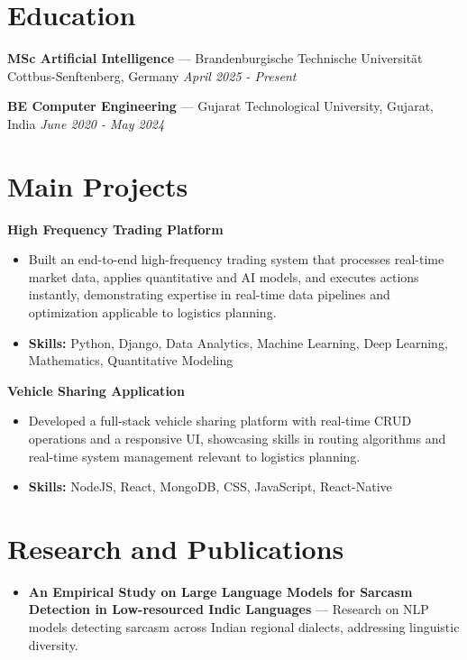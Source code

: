 \documentclass[a4paper,10pt]{article}
\begin{document}
\section*{Education}
\textbf{MSc Artificial Intelligence} — Brandenburgische Technische Universität Cottbus-Senftenberg, Germany \hfill \textit{April 2025 - Present}\par
\vspace{1.5pt}
\textbf{BE Computer Engineering} — Gujarat Technological University, Gujarat, India \hfill \textit{June 2020 - May 2024}\par

\section*{Main Projects}
\textbf{High Frequency Trading Platform}\par
\vspace{1pt}
\begin{itemize}
  \item Built an end-to-end high-frequency trading system that processes real-time market data, applies quantitative and AI models, and executes actions instantly, demonstrating expertise in real-time data pipelines and optimization applicable to logistics planning.
  \item \textbf{Skills:} Python, Django, Data Analytics, Machine Learning, Deep Learning, Mathematics, Quantitative Modeling
\end{itemize}
\vspace{3pt}
\textbf{Vehicle Sharing Application}\par
\vspace{1pt}
\begin{itemize}
  \item Developed a full-stack vehicle sharing platform with real-time CRUD operations and a responsive UI, showcasing skills in routing algorithms and real-time system management relevant to logistics planning.
  \item \textbf{Skills:} NodeJS, React, MongoDB, CSS, JavaScript, React-Native
\end{itemize}

\section*{Research and Publications}
\begin{itemize}
\item \textbf{An Empirical Study on Large Language Models for Sarcasm Detection in Low-resourced Indic Languages} — Research on NLP models detecting sarcasm across Indian regional dialects, addressing linguistic diversity.
\end{itemize}
\end{document}
